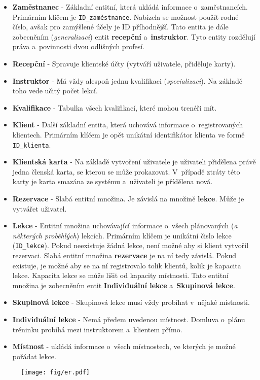 \documentclass[a4paper]{article}
\begin{document}
      \begin{itemize}
        \item \textbf{Zaměstnanec} - Základní entitní, která ukládá informace o~zaměstnancích. Primárním klíčem je \texttt{ID\_zaměstnance}. Nabízela se možnost použít rodné číslo, avšak pro zamýšlené účely je ID příhodnější. Tato entita je dále zobecněním (\textit{generalizací}) entit \textbf{recepční} a~\textbf{instruktor}. Tyto entity rozdělují práva a~povinnosti dvou odlišných profesí.
        \item \textbf{Recepční} - Spravuje klientské účty (vytváří uživatele, přiděluje karty).
        \item \textbf{Instruktor} - Má vždy alespoň jednu kvalifikaci (\textit{specializaci}). Na základě toho vede učitý počet lekcí.
        \item \textbf{Kvalifikace} - Tabulka všech kvalifikací, které mohou trenéři mít.
        \item \textbf{Klient} - Další základní entita, která uchovává informace o~registrovaných klientech. Primárním klíčem je opět unikátní identifikátor klienta ve formě \texttt{ID\_klienta}. 
        \item \textbf{Klientská karta} - Na základě vytvoření uživatele je uživateli přidělena právě jedna členská karta, se kterou se může prokazovat. V~případě ztráty této karty je karta smazána ze systému a~uživateli je přídělena nová.
        \item \textbf{Rezervace} - Slabá entitní množina. Je závislá na množině \textbf{lekce}. Může je vytvářet uživatel.
        \item \textbf{Lekce} - Entitní množina uchovávající informace o~všech plánovaných (\textit{a některých proběhlých}) lekcích. Primárním klíčem je unikátní čislo lekce (\texttt{ID\_lekce}). Pokud neexistuje žádná lekce, není možné aby si klient vytvořil rezervaci. Slabá entitní množina \textbf{rezervace} je na ní tedy závislá. Pokud existuje, je možné aby se na ní registrovalo tolik klientů, kolik je kapacita lekce. Kapacita lekce se může lišit od kapacity místnosti. Tato entitní množina je zobecněním entit \textbf{Individuální lekce} a~\textbf{Skupinová lekce}. 
        \item \textbf{Skupinová lekce} - Skupinová lekce musí vždy probíhat v~nějaké místnosti.
        \item \textbf{Individuální lekce} - Nemá předem uvedenou místnost. Domluva o~plánu tréninku probíhá mezi instruktorem a~klientem přímo.
        \item \textbf{Místnost} - ukládá informace o~všech místnostech, ve kterých je možné pořádat lekce.
      \end{itemize}

    \begin{figure}[H]
      \texttt{[image: fig/er.pdf]}
    \end{figure}

  
\end{document}
